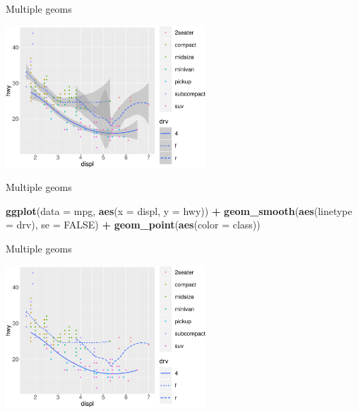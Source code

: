\documentclass[ignorenonframetext,]{beamer}
\newenvironment{Shaded}{\begin{snugshade}}{\end{snugshade}}
\newcommand{\DataTypeTok}[1]{\textcolor[rgb]{0.13,0.29,0.53}{#1}}
\newcommand{\KeywordTok}[1]{\textcolor[rgb]{0.13,0.29,0.53}{\textbf{#1}}}
\newcommand{\NormalTok}[1]{#1}
\newcommand{\OperatorTok}[1]{\textcolor[rgb]{0.81,0.36,0.00}{\textbf{#1}}}
\newcommand{\OtherTok}[1]{\textcolor[rgb]{0.56,0.35,0.01}{#1}}
\newcommand{\StringTok}[1]{\textcolor[rgb]{0.31,0.60,0.02}{#1}}
\begin{document}
\begin{frame}{Multiple geoms}
\protect\hypertarget{multiple-geoms-19}{}

\begin{center}\includegraphics[height=200px]{data-visualization_files/figure-beamer/unnamed-chunk-97-1} \end{center}

\end{frame}

\begin{frame}[fragile]{Multiple geoms}
\protect\hypertarget{multiple-geoms-20}{}

\begin{Shaded}
\begin{Highlighting}[]
\KeywordTok{ggplot}\NormalTok{(}\DataTypeTok{data =}\NormalTok{ mpg, }\KeywordTok{aes}\NormalTok{(}\DataTypeTok{x =}\NormalTok{ displ, }\DataTypeTok{y =}\NormalTok{ hwy)) }\OperatorTok{+}\StringTok{ }
\StringTok{  }\KeywordTok{geom_smooth}\NormalTok{(}\KeywordTok{aes}\NormalTok{(}\DataTypeTok{linetype =}\NormalTok{ drv), }\DataTypeTok{se =} \OtherTok{FALSE}\NormalTok{) }\OperatorTok{+}
\StringTok{  }\KeywordTok{geom_point}\NormalTok{(}\KeywordTok{aes}\NormalTok{(}\DataTypeTok{color =}\NormalTok{ class))}
\end{Highlighting}
\end{Shaded}

\end{frame}

\begin{frame}{Multiple geoms}
\protect\hypertarget{multiple-geoms-21}{}

\begin{center}\includegraphics[height=200px]{data-visualization_files/figure-beamer/unnamed-chunk-99-1} \end{center}

\end{frame}
\end{document}
